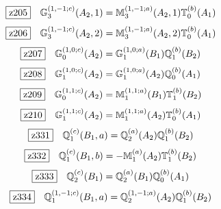 \documentclass[fleqn,10pt,landscape]{jsarticle}
\begin{document}
\begin{dmath*}
\hspace*{3mm}\fbox{z205}\quad \mathbb{G}_{3}^{(1,-1;c)}(A_{2},1)=\mathbb{M}_{3}^{(1,-1;a)}(A_{2},1) \mathbb{T}_{0}^{(b)}(A_{1})
\end{dmath*}
\begin{dmath*}
\hspace*{3mm}\fbox{z206}\quad \mathbb{G}_{3}^{(1,-1;c)}(A_{2},2)=\mathbb{M}_{3}^{(1,-1;a)}(A_{2},2) \mathbb{T}_{0}^{(b)}(A_{1})
\end{dmath*}
\begin{dmath*}
\hspace*{3mm}\fbox{z207}\quad \mathbb{G}_{0}^{(1,0;c)}(A_{2})=\mathbb{G}_{1}^{(1,0;a)}(B_{1}) \mathbb{Q}_{1}^{(b)}(B_{2})
\end{dmath*}
\begin{dmath*}
\hspace*{3mm}\fbox{z208}\quad \mathbb{G}_{1}^{(1,0;c)}(A_{2})=\mathbb{G}_{1}^{(1,0;a)}(A_{2}) \mathbb{Q}_{0}^{(b)}(A_{1})
\end{dmath*}
\begin{dmath*}
\hspace*{3mm}\fbox{z209}\quad \mathbb{G}_{0}^{(1,1;c)}(A_{2})=\mathbb{M}_{1}^{(1,1;a)}(B_{1}) \mathbb{T}_{1}^{(b)}(B_{2})
\end{dmath*}
\begin{dmath*}
\hspace*{3mm}\fbox{z210}\quad \mathbb{G}_{1}^{(1,1;c)}(A_{2})=\mathbb{M}_{1}^{(1,1;a)}(A_{2}) \mathbb{T}_{0}^{(b)}(A_{1})
\end{dmath*}
\begin{dmath*}
\hspace*{3mm}\fbox{z331}\quad \mathbb{Q}_{1}^{(c)}(B_{1},a)=\mathbb{Q}_{2}^{(a)}(A_{2}) \mathbb{Q}_{1}^{(b)}(B_{2})
\end{dmath*}
\begin{dmath*}
\hspace*{3mm}\fbox{z332}\quad \mathbb{Q}_{1}^{(c)}(B_{1},b)=- \mathbb{M}_{1}^{(a)}(A_{2}) \mathbb{T}_{1}^{(b)}(B_{2})
\end{dmath*}
\begin{dmath*}
\hspace*{3mm}\fbox{z333}\quad \mathbb{Q}_{2}^{(c)}(B_{1})=\mathbb{Q}_{2}^{(a)}(B_{1}) \mathbb{Q}_{0}^{(b)}(A_{1})
\end{dmath*}
\begin{dmath*}
\hspace*{3mm}\fbox{z334}\quad \mathbb{Q}_{1}^{(1,-1;c)}(B_{1},a)=\mathbb{Q}_{2}^{(1,-1;a)}(A_{2}) \mathbb{Q}_{1}^{(b)}(B_{2})
\end{dmath*}
\end{document}
